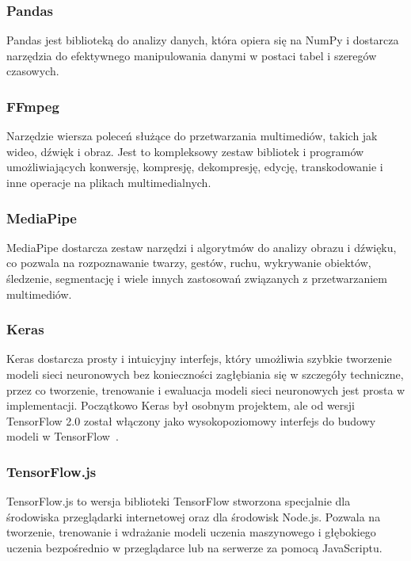 \subsubsection{Pandas}
\label{subsubsec:pandas}

Pandas jest biblioteką do analizy danych, która opiera się na NumPy i dostarcza narzędzia do efektywnego manipulowania danymi w postaci tabel i szeregów czasowych.

\subsubsection{FFmpeg}
\label{subsubsec:ffmpeg}

Narzędzie wiersza poleceń służące do przetwarzania multimediów, takich jak wideo, dźwięk i obraz. Jest to kompleksowy zestaw bibliotek i programów umożliwiających konwersję, kompresję, dekompresję, edycję, transkodowanie i inne operacje na plikach multimedialnych.

\subsubsection{MediaPipe}
\label{subsubsec:mediapipe}

MediaPipe dostarcza zestaw narzędzi i algorytmów do analizy obrazu i dźwięku, co pozwala na rozpoznawanie twarzy, gestów, ruchu, wykrywanie obiektów, śledzenie, segmentację i wiele innych zastosowań związanych z przetwarzaniem multimediów.

\subsubsection{Keras}
\label{subsubsec:keras}

Keras dostarcza prosty i intuicyjny interfejs, który umożliwia szybkie tworzenie modeli sieci neuronowych bez konieczności zagłębiania się w szczegóły techniczne, przez co tworzenie, trenowanie i ewaluacja modeli sieci neuronowych jest prosta w implementacji. Początkowo Keras był osobnym projektem, ale od wersji TensorFlow 2.0 został włączony jako wysokopoziomowy interfejs do budowy modeli w TensorFlow~\cite{tensorflow2019}.

\subsubsection{TensorFlow.js}
\label{subsubsec:tensorflow-js}

TensorFlow.js to wersja biblioteki TensorFlow stworzona specjalnie dla środowiska przeglądarki internetowej oraz dla środowisk Node.js. Pozwala na tworzenie, trenowanie i wdrażanie modeli uczenia maszynowego i głębokiego uczenia bezpośrednio w przeglądarce lub na serwerze za pomocą JavaScriptu.

